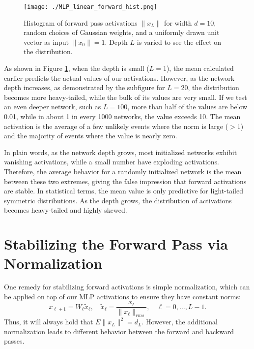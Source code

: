\begin{figure}[H]
    \centering
    \texttt{[image: ./MLP\_linear\_forward\_hist.png]}
    \caption{Histogram of forward pass activations \( \|x_L\| \) for width \( d=10 \), random choices of Gaussian weights, and a uniformly drawn unit vector as input \( \|x_0\|=1 \). Depth \( L \) is varied to see the effect on the distribution.}
    \label{fig:MLP_hist}
\end{figure}

\begin{remark}
As shown in Figure \ref{fig:MLP_hist}, when the depth is small (\( L=1 \)), the mean calculated earlier predicts the actual values of our activations. However, as the network depth increases, as demonstrated by the subfigure for \( L=20 \), the distribution becomes more heavy-tailed, while the bulk of its values are very small. If we test an even deeper network, such as \( L=100 \), more than half of the values are below 0.01, while in about 1 in every 1000 networks, the value exceeds 10. The mean activation is the average of a few unlikely events where the norm is large (\( >1 \)) and the majority of events where the value is nearly zero.
\end{remark}

In plain words, as the network depth grows, most initialized networks exhibit vanishing activations, while a small number have exploding activations. Therefore, the average behavior for a randomly initialized network is the mean between these two extremes, giving the false impression that forward activations are stable. In statistical terms, the mean value is only predictive for light-tailed symmetric distributions. As the depth grows, the distribution of activations becomes heavy-tailed and highly skewed.

\section{Stabilizing the Forward Pass via Normalization}

\begin{theorem}
One remedy for stabilizing forward activations is simple normalization, which can be applied on top of our MLP activations to ensure they have constant norms:
\begin{equation}
x_{\ell+1} = W_\ell \tilde{x}_\ell, \quad \tilde{x}_\ell = \frac{x_\ell}{\|x_\ell\|_{rms}}, \quad \ell = 0, \dots, L-1.
\end{equation}
Thus, it will always hold that \( E \|x_L\|^2 = d_L \). However, the additional normalization leads to different behavior between the forward and backward passes.
\end{theorem}

